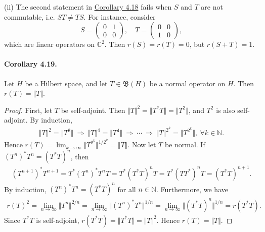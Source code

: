 \documentclass{article}
\begin{document}
(ii) The second statement in \hyperref[cor:4.18]{Corollary 4.18} fails when $S$ and $T$ are not commutable, i.e. $ST\neq TS$. For instance, consider $$S=\begin{pmatrix} 0 & 1 \\ 0 & 0 \end{pmatrix},\quad T=\begin{pmatrix} 0 & 0 \\ 1 & 0 \end{pmatrix},$$ which are linear operators on $\mathbb{C}^2$. Then $r(S)=r(T)=0$, but $r(S+T)=1$.

\paragraph{Corollary 4.19.\label{cor:4.19}} Let $H$ be a Hilbert space, and let $T\in\mathfrak{B}(H)$ be a normal operator on $H$. Then $r(T)=\Vert T\Vert$.
\begin{proof}
First, let $T$ be self-adjoint. Then $\Vert T\Vert^2 = \Vert T^*T\Vert = \Vert T^2\Vert$, and $T^2$ is also self-adjoint. By induction,
\begin{align*}
	\Vert T\Vert^2 = \Vert T^2\Vert\ \Rightarrow\ \Vert T\Vert^4 = \Vert T^4\Vert\ \Rightarrow\ \cdots\ \Rightarrow\ \Vert T\Vert^{2^k} = \bigl\Vert T^{2^k}\bigr\Vert,\ \forall k\in\mathbb{N}.
\end{align*}
Hence $r(T)=\lim_{k\to\infty}\bigl\Vert T^{2^k}\bigr\Vert^{1/2^k} = \Vert T\Vert$. Now let $T$ be normal. If $(T^n)^*T^n = (T^*T)^n$, then
\begin{align*}
	(T^{n+1})^*T^{n+1} = T^*(T^n)^*T^n T = T^*(T^*T)^nT = T^*(TT^*)^nT = (T^*T)^{n+1}.
\end{align*}
By induction, $(T^n)^*T^n = (T^*T)^n$ for all $n\in\mathbb{N}$. Furthermore, we have
\begin{align*}
r(T)^2=\lim_{n\to\infty}\Vert T^n\Vert^{2/n} = \lim_{n\to\infty}\Vert (T^n)^*T^n\Vert^{1/n}  =\lim_{n\to\infty}\Vert (T^*T)^n\Vert^{1/n} = r(T^*T).
\end{align*}
Since $T^*T$ is self-adjoint, $r(T^*T)=\Vert T^*T\Vert = \Vert T\Vert^2$. Hence $r(T)=\Vert T\Vert$.
\end{proof}
\end{document}
